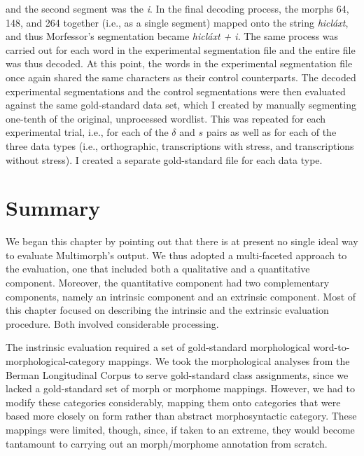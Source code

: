 {and the second segment was the \emph{i}. In the final decoding process, 
the morphs 64, 148, and 264 together (i.e., as a single segment) mapped onto the string \textit{hicl\'{a}xt}, 
and thus Morfessor's segmentation became \textit{hicl\'{a}xt + i}.
The same process was carried out for each word in the experimental segmentation file and the entire file was thus decoded. At this point, the words in the experimental segmentation file once again shared the same characters as their control counterparts.
The decoded experimental segmentations and the control segmentations were then evaluated against the same gold-standard data set, which I created by manually segmenting 
one-tenth of the original, unprocessed wordlist. 
This was repeated for each experimental trial, i.e., for each of the $\delta$ and $s$ 
pairs as well as for each of the three data types (i.e., orthographic, transcriptions with stress, 
and transcriptions without stress).
I created a separate gold-standard file for each data type.

\section{Summary}
We began this chapter by pointing out that there is at present no single ideal way to evaluate Multimorph's output.
We thus adopted a multi-faceted approach to the evaluation, one that included both a qualitative and
a quantitative component. Moreover, the quantitative component had two complementary components, namely an intrinsic component and an extrinsic component. Most of this chapter focused on describing the intrinsic and the extrinsic evaluation procedure. Both involved considerable processing. 

The instrinsic evaluation required a set of gold-standard morphological word-to-morphological-category mappings. We took the morphological analyses from the Berman Longitudinal Corpus to serve gold-standard class assignments, since we lacked a gold-standard set of morph or morphome mappings. However, we had to modify these categories considerably, mapping them onto categories that were based more closely on form rather than abstract morphosyntactic category. These mappings were limited, though, since, if taken to an extreme, they would become tantamount to carrying out an morph/morphome annotation from scratch.

}
